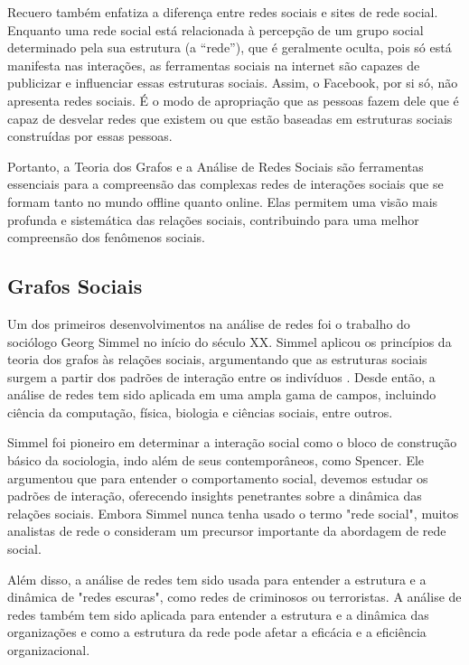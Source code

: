 Recuero também enfatiza a diferença entre redes sociais e sites de rede social. Enquanto uma rede social está relacionada à percepção de um grupo social determinado pela sua estrutura (a “rede”), que é geralmente oculta, pois só está manifesta nas interações, as ferramentas sociais na internet são capazes de publicizar e influenciar essas estruturas sociais. Assim, o Facebook, por si só, não apresenta redes sociais. É o modo de apropriação que as pessoas fazem dele que é capaz de desvelar redes que existem ou que estão baseadas em estruturas sociais construídas por essas pessoas.

Portanto, a Teoria dos Grafos e a Análise de Redes Sociais são ferramentas essenciais para a compreensão das complexas redes de interações sociais que se formam tanto no mundo offline quanto online. Elas permitem uma visão mais profunda e sistemática das relações sociais, contribuindo para uma melhor compreensão dos fenômenos sociais.

\subsection*{Grafos Sociais}

Um dos primeiros desenvolvimentos na análise de redes foi o trabalho do sociólogo Georg Simmel no início do século XX. Simmel aplicou os princípios da teoria dos grafos às relações sociais, argumentando que as estruturas sociais surgem a partir dos padrões de interação entre os indivíduos \cite[]{2021_Hollstein}. Desde então, a análise de redes tem sido aplicada em uma ampla gama de campos, incluindo ciência da computação, física, biologia e ciências sociais, entre outros.

Simmel foi pioneiro em determinar a interação social como o bloco de construção básico da sociologia, indo além de seus contemporâneos, como Spencer. Ele argumentou que para entender o comportamento social, devemos estudar os padrões de interação, oferecendo insights penetrantes sobre a dinâmica das relações sociais. Embora Simmel nunca tenha usado o termo "rede social", muitos analistas de rede o consideram um precursor importante da abordagem de rede social.

Além disso, a análise de redes tem sido usada para entender a estrutura e a dinâmica de "redes escuras", como redes de criminosos ou terroristas. A análise de redes também tem sido aplicada para entender a estrutura e a dinâmica das organizações e como a estrutura da rede pode afetar a eficácia e a eficiência organizacional.

